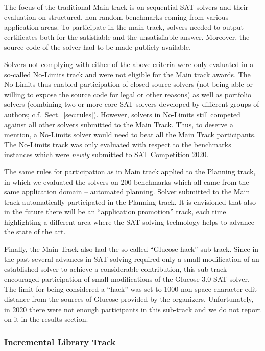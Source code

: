 \documentclass{elsarticle}
\begin{document}
The focus of the traditional Main track is on sequential SAT solvers and their evaluation on structured, non-random benchmarks coming from various application areas. To participate in the main track, solvers needed to output certificates both for the satisfiable and the unsatisfiable answer. Moreover, the source code of the solver had to be made publicly available. 

Solvers not complying with either of the above criteria were only evaluated in a so-called No-Limits track and were not eligible for the Main track awards.
The No-Limits thus enabled participation of closed-source solvers (not being able or willing to expose the source code for legal or other reasons) 
as well as portfolio solvers (combining two or more core SAT solvers developed by different groups of authors; c.f.~Sect.~\ref{sec:rules}).
However, solvers in No-Limits still competed against all other solvers submitted to the Main Track.
Thus, to deserve a mention, a No-Limits solver would need to beat all the Main Track participants.
The No-Limits track was only evaluated with respect to the benchmarks instances which were \emph{newly} submitted to SAT Competition 2020.

The same rules for participation as in Main track applied to the Planning track, in which we evaluated the solvers on 200 benchmarks 
which all came from the same application domain -- automated planning. 
Solver submitted to the Main track automatically participated in the Planning track.
It is envisioned that also in the future there will be an ``application promotion'' track,
each time highlighting a different area where the SAT solving technology helps to advance the state of the art.

Finally, the Main Track also had the so-called ``Glucose hack'' sub-track. 
Since in the past several advances in SAT solving required only a small modification of an established solver
to achieve a considerable contribution, this sub-track encouraged participation 
of small modifications of the Glucose 3.0 SAT solver. The limit for being considered a ``hack''
was set to 1000 non-space character edit distance from the sources of Glucose provided by the organizers. 
Unfortunately, in 2020 there were not enough participants in this sub-track and we do not report on it 
in the results section.

\subsubsection{Incremental Library Track}
\end{document}
